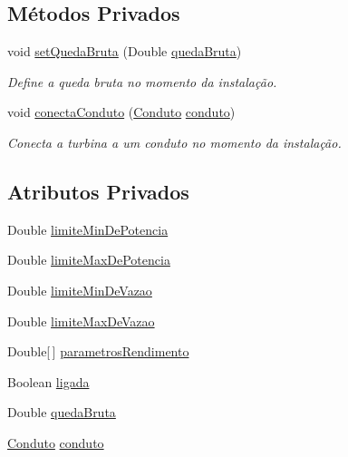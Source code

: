 \subsection*{Métodos Privados}
\begin{DoxyCompactItemize}
\item 
void \hyperlink{classusina_1_1_turbina_a373df75de3c1226b0d518254ae3831bf}{set\-Queda\-Bruta} (Double \hyperlink{classusina_1_1_turbina_a74ca99529c8c56c1ffddba8bc914c442}{queda\-Bruta})
\begin{DoxyCompactList}\small\item\em Define a queda bruta no momento da instalação. \end{DoxyCompactList}\item 
void \hyperlink{classusina_1_1_turbina_a15f7eae41d56f2cbb7a271a3af549350}{conecta\-Conduto} (\hyperlink{classusina_1_1tubulacao_1_1_conduto}{Conduto} \hyperlink{classusina_1_1_turbina_aaf9ebcc66e369abbf1ccf644579e1348}{conduto})
\begin{DoxyCompactList}\small\item\em Conecta a turbina a um conduto no momento da instalação. \end{DoxyCompactList}\end{DoxyCompactItemize}
\subsection*{Atributos Privados}
\begin{DoxyCompactItemize}
\item 
Double \hyperlink{classusina_1_1_turbina_a9d422881e2943b12a26cb27caf92d08b}{limite\-Min\-De\-Potencia}
\item 
Double \hyperlink{classusina_1_1_turbina_ab6648bca34b30eedf9f9246fe7bfde00}{limite\-Max\-De\-Potencia}
\item 
Double \hyperlink{classusina_1_1_turbina_a549b44e83d93c34fc79bdeb688c60b7d}{limite\-Min\-De\-Vazao}
\item 
Double \hyperlink{classusina_1_1_turbina_a0f961379b5f4e4779f98d15dd093c6ba}{limite\-Max\-De\-Vazao}
\item 
Double\mbox{[}$\,$\mbox{]} \hyperlink{classusina_1_1_turbina_a5787dbae79e4108296573fd4dbf156da}{parametros\-Rendimento}
\item 
Boolean \hyperlink{classusina_1_1_turbina_afe4aa27ba1150a9b4a2a7d9ec622ab4f}{ligada}
\item 
Double \hyperlink{classusina_1_1_turbina_a74ca99529c8c56c1ffddba8bc914c442}{queda\-Bruta}
\item 
\hyperlink{classusina_1_1tubulacao_1_1_conduto}{Conduto} \hyperlink{classusina_1_1_turbina_aaf9ebcc66e369abbf1ccf644579e1348}{conduto}
\end{DoxyCompactItemize}


